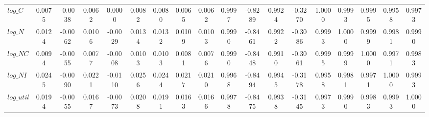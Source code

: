 \begin{center}
\begin{longtable}{lccccccccccccccccc}
$log\_C     $	 & 	       0.0075	 & 	      -0.0038	 & 	       0.0062	 & 	       0.0000	 & 	       0.0082	 & 	       0.0080	 & 	       0.0065	 & 	       0.0062	 & 	       0.9997	 & 	      -0.8289	 & 	       0.9924	 & 	      -0.3270	 & 	       1.0000	 & 	       0.9993	 & 	       0.9995	 & 	       0.9958	 & 	       0.9973 \\ 
$log\_N     $	 & 	       0.0124	 & 	      -0.0062	 & 	       0.0106	 & 	      -0.0029	 & 	       0.0134	 & 	       0.0132	 & 	       0.0109	 & 	       0.0103	 & 	       0.9990	 & 	      -0.8461	 & 	       0.9922	 & 	      -0.3086	 & 	       0.9993	 & 	       1.0000	 & 	       0.9999	 & 	       0.9981	 & 	       0.9990 \\ 
$log\_NC    $	 & 	       0.0094	 & 	      -0.0055	 & 	       0.0077	 & 	      -0.0008	 & 	       0.0103	 & 	       0.0103	 & 	       0.0081	 & 	       0.0076	 & 	       0.9990	 & 	      -0.8448	 & 	       0.9910	 & 	      -0.3061	 & 	       0.9995	 & 	       0.9999	 & 	       1.0000	 & 	       0.9971	 & 	       0.9983 \\ 
$log\_NI    $	 & 	       0.0245	 & 	      -0.0090	 & 	       0.0221	 & 	      -0.0110	 & 	       0.0256	 & 	       0.0244	 & 	       0.0217	 & 	       0.0210	 & 	       0.9968	 & 	      -0.8494	 & 	       0.9945	 & 	      -0.3178	 & 	       0.9958	 & 	       0.9981	 & 	       0.9971	 & 	       1.0000	 & 	       0.9993 \\ 
$log\_util  $	 & 	       0.0194	 & 	      -0.0055	 & 	       0.0167	 & 	      -0.0073	 & 	       0.0208	 & 	       0.0191	 & 	       0.0163	 & 	       0.0166	 & 	       0.9978	 & 	      -0.8475	 & 	       0.9938	 & 	      -0.3145	 & 	       0.9973	 & 	       0.9990	 & 	       0.9983	 & 	       0.9993	 & 	       1.0000 \\ 
\end{longtable}
 \end{center}
